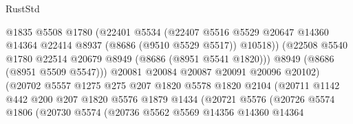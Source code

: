 \begin{lexlean}{RustStd}
\begin{coremodule}
                                  @1835
                                  @5508
                                  @1780
                                  (@22401
                                    @5534
                                    (@22407
                                      @5516
                                      @5529
                                      @20647
                                      @14360
                                      @14364
                                      @22414
                                      @8937
                                      (@8686 (@9510 @5529 @5517))
                                      @10518))
                                  (@22508
                                    @5540
                                    @1780
                                    @22514
                                    @20679
                                    @8949
                                    (@8686 (@8951 @5541 @1820)))
                                  @8949
                                  (@8686 (@8951 @5509 @5547)))
                                @20081
                                @20084
                                @20087
                                @20091
                                @20096
                                @20102)
                              (@20702
                                @5557
                                @1275
                                @275
                                @207
                                @1820
                                @5578
                                @1820
                                @2104
                                (@20711
                                  @1142
                                  @442
                                  @200
                                  @207
                                  @1820
                                  @5576
                                  @1879
                                  @1434
                                  (@20721
                                    @5576
                                    (@20726
                                      @5574
                                      @1806
                                      (@20730
                                        @5574
                                        (@20736
                                          @5562
                                          @5569
                                          @14356
                                          @14360
                                          @14364

\end{coremodule}
\end{lexlean}
